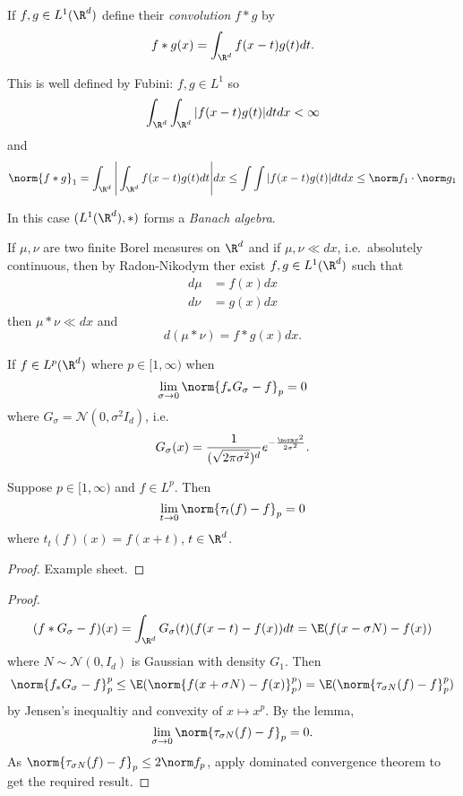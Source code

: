 \documentclass[a4paper]{article}
\begin{document}
\begin{definition}[convolution]
  If \(f, g \in L^1(\R^d)\) define their \emph{convolution} \(f * g\) by
  \[
    f * g (x) = \int_{\R^d} f(x - t) g(t) dt.
  \]
\end{definition}

This is well defined by Fubini: \(f, g \in L^1\) so
\[
  \int_{\R^d} \int_{\R^d} |f(x - t) g(t)| dt dx < \infty
\]
and
\[
  \norm{f * g}_1
  = \int_{\R^d} \Bigg| \int_{\R^d} f(x - t) g(t) dt \Bigg| dx
  \leq \int \int |f(x - t) g(t)| dt dx
  \leq \norm f_1 \cdot \norm g_1
\]

In this case \((L^1(\R^d), *)\) forms a \emph{Banach algebra}.

\begin{remark}
  If \(\mu, \nu\) are two finite Borel measures on \(\R^d\) and if \(\mu, \nu \ll dx\), i.e.\ absolutely continuous, then by Radon-Nikodym ther exist \(f, g \in L^1(\R^d)\) such that
  \begin{align*}
    d\mu &= f(x) dx \\
    d\nu &= g(x) dx
  \end{align*}
  then \(\mu * \nu \ll dx\)  and
  \[
    d(\mu * \nu) = f * g (x) dx.
  \]
\end{remark}

\begin{proposition}
  If \(f \in L^p(\R^d)\) where \(p \in [1, \infty)\) when
  \[
    \lim_{\sigma \to 0} \norm{f_* G_\sigma - f}_p = 0
  \]
  where \(G_\sigma = \mathcal N(0, \sigma^2 I_d)\), i.e.
  \[
    G_\sigma(x) = \frac{1}{(\sqrt{2\pi \sigma^2})^d} e^{- \frac{\norm x^2}{2\sigma^2}}.
  \]
\end{proposition}

\begin{lemma}
  Suppose \(p \in [1, \infty)\)  %
  and \(f \in L^p\). Then
  \[
    \lim_{t \to 0} \norm{\tau_t(f) - f}_p = 0
  \]
  where \(t_t(f)(x) = f(x + t)\), \(t \in \R^d\).
\end{lemma}

\begin{proof}
  Example sheet.
\end{proof}

\begin{proof}
  \[
    (f * G_\sigma - f)(x)
    = \int_{\R^d} G_\sigma(t) (f(x - t) - f(x)) dt
    = \E(f(x - \sigma N) - f(x))
  \]
  where \(N \sim \mathcal N(0, I_d)\) is Gaussian with density \(G_1\). Then
  \[
    \norm{f_*G_\sigma - f}_p^p
    \leq \E(\norm{f(x + \sigma N) - f(x)}_p^p)
    = \E(\norm{\tau_{\sigma N}(f) - f}_p^p)
  \]
  by Jensen's inequaltiy and convexity of \(x \mapsto x^p\). By the lemma,
  \[
    \lim_{\sigma \to 0} \norm{\tau_{\sigma N}(f) - f}_p = 0.
  \]
  As \(\norm{\tau_{\sigma N}(f) - f}_p \leq 2 \norm f_p\), apply dominated convergence theorem to get the required result.
\end{proof}
\end{document}
